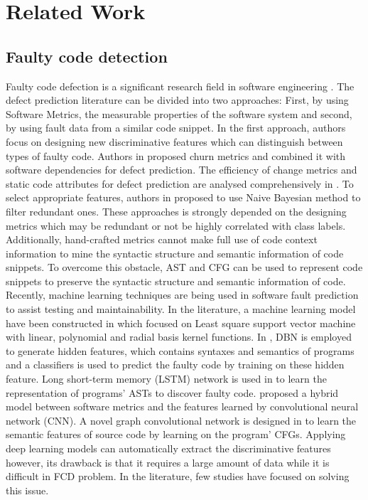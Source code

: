 \section{Related Work}
\label{sec:related_work}
\subsection{Faulty code detection}
Faulty code defection is a significant research field in software engineering \cite{minku2016data}. The  defect  prediction  literature can be divided into two approaches: First,  by  using Software Metrics, the measurable properties of the software system and second, by using fault data from a similar code snippet. In the first approach, authors focus on designing new discriminative features which can distinguish  between  types  of  faulty  code. Authors in \cite{nagappan2007using} proposed churn metrics and combined it with software dependencies for defect prediction. The efficiency of change metrics and static code attributes for defect prediction are analysed comprehensively in \cite{moser2008comparative}. To select appropriate features, authors in \cite{arar2017feature} proposed to use Naive Bayesian method to filter redundant ones. These approaches is strongly depended on the designing metrics which may be redundant or not be highly correlated with class labels. Additionally, hand-crafted metrics cannot make full use of code context information to mine the syntactic structure and semantic information of code snippets. To overcome this obstacle, AST and CFG can be used to represent code snippets to preserve the syntactic structure and semantic information of code. Recently, machine  learning  techniques  are  being  used  in  software  fault  prediction to assist testing and maintainability. In the literature, a machine learning model have been constructed in \cite{kumar2018effective} which focused on Least square support vector machine with linear, polynomial and radial basis kernel functions. In \cite{wang2016automatically}, DBN is employed to generate hidden features, which contains syntaxes and semantics of programs and a classifiers is used to predict the faulty code by training on these hidden feature. Long short-term memory (LSTM) network is used in \cite{lin2018cross} to learn the representation of programs' ASTs to discover faulty code. \cite{li2017software} proposed a hybrid model between software metrics and the features learned by convolutional neural network (CNN). A novel graph convolutional network is designed in \cite{phan2017convolutional} to learn the semantic features of source code by learning on the program' CFGs. Applying deep learning models can automatically extract the discriminative features however, its drawback is that it requires a large amount of data while it is difficult in FCD problem. In the literature, few studies have focused on solving this issue. 

